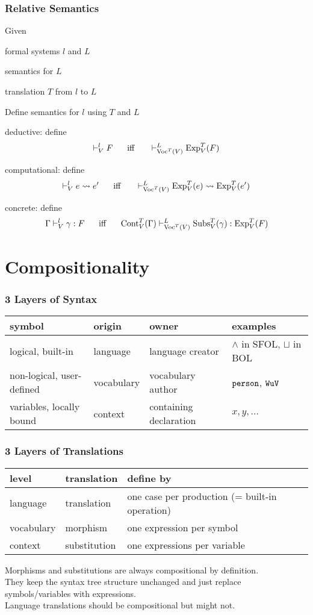 \begin{frame}\frametitle{Relative Semantics}
\begin{blockitems}{Given}
 \item formal systems $l$ and $L$
 \item semantics for $L$
 \item translation $T$ from $l$ to $L$
\end{blockitems}

\begin{blockitems}{Define semantics for $l$ using $T$ and $L$}
\item deductive: define
 \[\vdash^l_V F \hspace*{.5cm}\;\mathrm{iff}\;\hspace*{.5cm} \vdash^L_{\mathrm{Voc}^T(V)} \mathrm{Exp}^T_V(F) \]
\item computational: define
 \[\vdash^l_V e\rightsquigarrow e' \hspace*{.5cm}\;\mathrm{iff}\;\hspace*{.5cm} \vdash^L_{\mathrm{Voc}^T(V)}\mathrm{Exp}^T_V(e)\rightsquigarrow \mathrm{Exp}^T_V(e')\]
\item concrete: define
 \[\Gamma\vdash^l_V \gamma:F \hspace*{.5cm}\;\mathrm{iff}\;\hspace*{.5cm} \mathrm{Cont}^T_V(\Gamma)\vdash^L_{\mathrm{Voc}^T(V)}\mathrm{Subs}^T_V(\gamma):\mathrm{Exp}^T_V(F)\]
\end{blockitems}
\end{frame}

\section{Compositionality}

\begin{frame}\frametitle{3 Layers of Syntax}
\begin{tabular}{l|lll}
symbol                 & origin     & owner  & examples \\
\hline
logical, built-in      & language   & language creator  & $\wedge$ in SFOL, $\sqcup$ in BOL \\
non-logical, user-defined & vocabulary & vocabulary author & $\cn{person}$, $\cn{WuV}$\\
variables, locally bound  & context    & containing declaration & $x, y,\ldots$ \\
\end{tabular}
\end{frame}

\begin{frame}\frametitle{3 Layers of Translations}
\begin{tabular}{l|ll}
level & translation & define by\\
\hline
language & translation & one case per production (= built-in operation)\\
vocabulary & morphism & one expression per symbol\\
context & substitution & one expressions per variable \\
\end{tabular}
\bigskip

Morphisms and substitutions are always compositional by definition.\\
They keep the syntax tree structure unchanged and just replace symbols/variables with expressions.\\
Language translations should be compositional but might not.
\end{frame}

